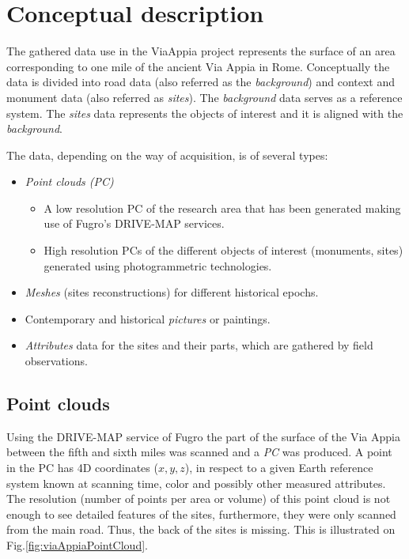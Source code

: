 \section{Conceptual description}
\label{sec:concept_descr}

The gathered data use in the ViaAppia project represents the surface of an area
corresponding to one mile of the ancient Via Appia in Rome. Conceptually the
data is divided into road data (also referred as the {\em background}) and
context and monument data (also referred as {\em sites}). The {\em background}
data serves as a reference system. The {\em sites} data represents the objects
of interest and it is aligned with the {\em background}.

The data, depending on the way of acquisition, is of several types:
\begin{itemize} 
\item {\em Point clouds (PC)}
    \begin{itemize} 
    \item A low resolution PC of the research area that has been generated making
    use of Fugro's DRIVE-MAP services.
    \item High resolution PCs of the different objects of interest (monuments,
    sites) generated using photogrammetric technologies.
    \end{itemize}
\item {\em Meshes} (sites reconstructions) for different historical epochs.
\item Contemporary and historical {\em pictures} or paintings.
\item {\em Attributes} data for the sites and their parts, which are gathered
by field observations.
\end{itemize}

\subsection{Point clouds}
Using the DRIVE-MAP service of Fugro the part of the
surface of the Via Appia between the fifth and sixth miles was scanned and a
{\em PC} was produced. A point in the PC has 4D coordinates ($x, y, z$), in
respect to a given Earth reference system known at scanning time, color and
possibly other measured attributes. The resolution (number of points per area
or volume) of this point cloud is not enough to see detailed features of the
sites, furthermore, they were only scanned from the main road. Thus, the back
of the sites is missing. This is illustrated on Fig.\ref{fig:viaAppiaPointCloud}.

